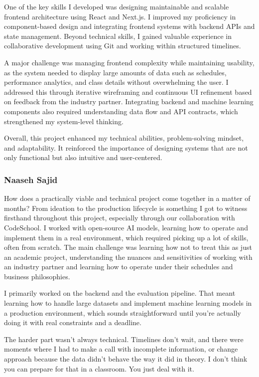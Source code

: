 One of the key skills I developed was designing maintainable and scalable frontend architecture using React and Next.js. I improved my proficiency in component-based design and integrating frontend systems with backend APIs and state management. Beyond technical skills, I gained valuable experience in collaborative development using Git and working within structured timelines.

A major challenge was managing frontend complexity while maintaining usability, as the system needed to display large amounts of data such as schedules, performance analytics, and class details without overwhelming the user. I addressed this through iterative wireframing and continuous UI refinement based on feedback from the industry partner. Integrating backend and machine learning components also required understanding data flow and API contracts, which strengthened my system-level thinking.

Overall, this project enhanced my technical abilities, problem-solving mindset, and adaptability. It reinforced the importance of designing systems that are not only functional but also intuitive and user-centered.
\subsubsection{Naaseh Sajid}

  How does a practically viable and technical project come together in a matter of months? From ideation to the
  production lifecycle is something I got to witness firsthand throughout this project, especially through our          
  collaboration with CodeSchool. I worked with open-source AI models, learning how to operate and implement them in a
  real environment, which required picking up a lot of skills, often from scratch. The main challenge was learning how  
  not to treat this as just an academic project, understanding the nuances and sensitivities of working with an industry
   partner and learning how to operate under their schedules and business philosophies.

  I primarily worked on the backend and the evaluation pipeline. That meant learning how to handle large datasets and   
  implement machine learning models in a production environment, which sounds straightforward until you're actually
  doing it with real constraints and a deadline.                                                                        
                                     
  The harder part wasn't always technical. Timelines don't wait, and there were moments where I had to make a call with 
  incomplete information, or change approach because the data didn't behave the way it did in theory. I don't think you
  can prepare for that in a classroom. You just deal with it.                                                           
                                     
